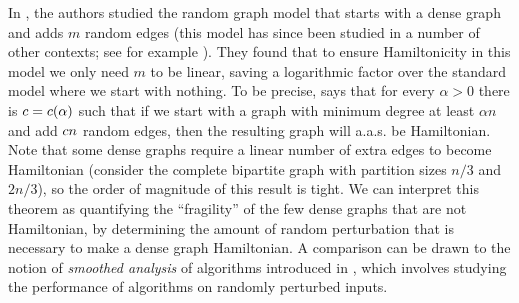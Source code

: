 \documentclass[11pt,english]{article}
\theoremstyle{plain}
\theoremstyle{definition}
\theoremstyle{definition}
\theoremstyle{plain}
\theoremstyle{plain}
\theoremstyle{plain}
\theoremstyle{plain}
\theoremstyle{remark}
\theoremstyle{remark}
\let\originalleft\left
\let\originalright\right
\renewcommand{\left}{\mathopen{}\mathclose\bgroup\originalleft}
\renewcommand{\right}{\aftergroup\egroup\originalright}
\begin{document}
In \cite{BFM03}, the authors studied the random graph model that
starts with a dense graph and adds $m$ random edges (this model has
since been studied in a number of other contexts; see for example
\cite{BHM04,KST06}). They found that to ensure Hamiltonicity in this
model we only need $m$ to be linear, saving a logarithmic factor
over the standard model where we start with nothing. To be precise,
\cite[Theorem~1]{BFM03} says that for every $\alpha>0$ there is
$\cdi=\cdi\left(\alpha\right)$ such that if we start with a graph with
minimum degree at least $\alpha n$ and add $c n$
random edges, then the resulting graph will a.a.s. be Hamiltonian.
Note that some dense graphs require a linear number of extra edges
to become Hamiltonian (consider the complete bipartite graph with
partition sizes $n/3$ and $2n/3$), so the order of magnitude of this result is tight. 
We can interpret this theorem as quantifying the ``fragility''
of the few dense graphs that are not Hamiltonian, by determining the
amount of random perturbation that is necessary to make a dense graph
Hamiltonian. A comparison can be drawn to the notion of \emph{smoothed
analysis} of algorithms introduced in \cite{ST04}, which involves
studying the performance of algorithms on randomly perturbed inputs.
\end{document}
